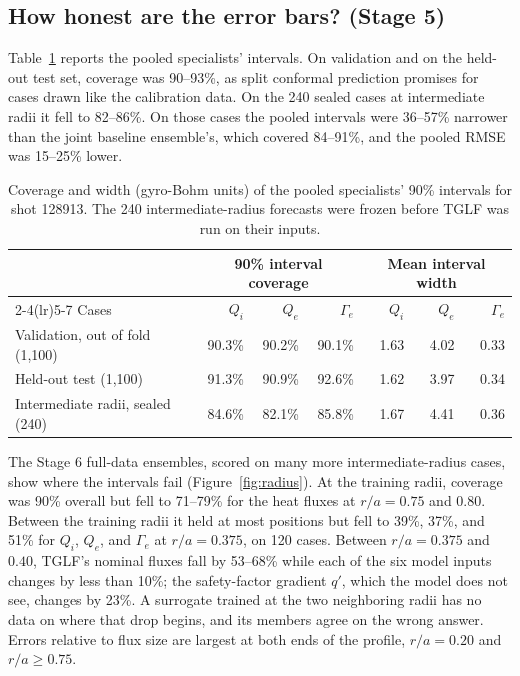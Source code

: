 \documentclass[12pt,letterpaper]{article}
\begin{document}
\subsection{How honest are the error bars? (Stage 5)}
\label{sec:res-intervals}

Table~\ref{tab:intervals} reports the pooled specialists' intervals. On validation and on
the held-out test set, coverage was 90--93\%, as split conformal prediction promises for
cases drawn like the calibration data. On the 240 sealed cases at intermediate radii it fell
to 82--86\%. On those cases the pooled intervals were 36--57\% narrower than the joint
baseline ensemble's, which covered 84--91\%, and the pooled RMSE was 15--25\% lower.

\begin{table}[tbp]
  \centering
  \small
  \begin{tabular}{lrrrrrr}
    \toprule
     & \multicolumn{3}{c}{90\% interval coverage} & \multicolumn{3}{c}{Mean interval width} \\
    \cmidrule(lr){2-4}\cmidrule(lr){5-7}
    Cases & $Q_i$ & $Q_e$ & $\Gamma_e$ & $Q_i$ & $Q_e$ & $\Gamma_e$ \\
    \midrule
    Validation, out of fold (1,100) & 90.3\% & 90.2\% & 90.1\% & 1.63 & 4.02 & 0.33 \\
    Held-out test (1,100) & 91.3\% & 90.9\% & 92.6\% & 1.62 & 3.97 & 0.34 \\
    Intermediate radii, sealed (240) & 84.6\% & 82.1\% & 85.8\% & 1.67 & 4.41 & 0.36 \\
    \bottomrule
  \end{tabular}
  \caption{Coverage and width (gyro-Bohm units) of the pooled specialists' 90\% intervals
    for shot 128913. The 240 intermediate-radius forecasts were frozen before TGLF was run
    on their inputs.}
  \label{tab:intervals}
\end{table}

The Stage 6 full-data ensembles, scored on many more intermediate-radius cases, show where
the intervals fail (Figure~\ref{fig:radius}). At the training radii, coverage was 90\%
overall but fell to 71--79\% for the heat fluxes at $r/a = 0.75$ and $0.80$. Between the
training radii it held at most positions but fell to 39\%, 37\%, and 51\% for $Q_i$, $Q_e$, and
$\Gamma_e$ at $r/a=0.375$, on 120 cases. Between $r/a = 0.375$ and $0.40$, TGLF's nominal
fluxes fall by 53--68\% while each of the six model inputs changes by less than 10\%; the
safety-factor gradient $q'$, which the model does not see, changes by 23\%. A surrogate
trained at the two neighboring radii has no data on where that drop begins, and its members
agree on the wrong answer. Errors relative to flux size are largest at both ends of the
profile, $r/a=0.20$ and $r/a \ge 0.75$.
\end{document}
